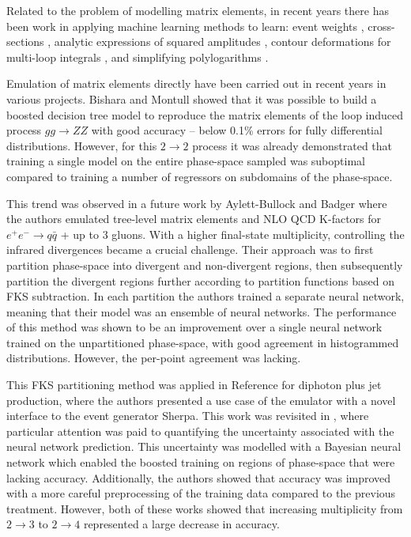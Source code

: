 \documentclass[main.tex]{subfiles}
\begin{document}
    Related to the problem of modelling matrix elements, in recent
    years there has been work in applying machine learning
    methods to learn: event weights \cite{Danziger:2021eeg},
    cross-sections \cite{Otten:2018kum,Buckley:2020bxg},
    analytic expressions of squared amplitudes \cite{Alnuqaydan:2022ncd},
    contour deformations for multi-loop integrals \cite{Winterhalder:2021ngy},
    and simplifying polylogarithms \cite{Dersy:2022bym}.

    Emulation of matrix elements directly have been
    carried out in recent years in various projects.
    Bishara and Montull showed \cite{Bishara:2019iwh} that it was possible to
    build a boosted decision tree model to reproduce
    the matrix elements of the loop induced process $gg \rightarrow ZZ$ with good accuracy --
    below 0.1\% errors for fully differential distributions.
    However, for this $2 \rightarrow 2$ process it was already demonstrated
    that training a single model on the entire phase-space sampled
    was suboptimal compared to training a number of regressors
    on subdomains of the phase-space.

    This trend was observed in a future work by Aylett-Bullock
    and Badger \cite{Badger:2020uow} where the authors emulated tree-level
    matrix elements and NLO QCD K-factors for $e^{+}e^{-} \rightarrow q \bar{q}$ +
    up to 3 gluons. With a higher final-state multiplicity, controlling
    the infrared divergences became a crucial challenge.
    Their approach was to first partition phase-space
    into divergent and non-divergent regions, then subsequently
    partition the divergent regions further according to partition functions
    based on FKS subtraction.
    In each partition the authors trained a separate neural network,
    meaning that their model was an ensemble of neural networks.
    The performance of this method was shown to be an improvement
    over a single neural network trained on the unpartitioned phase-space,
    with good agreement in histogrammed distributions. However,
    the per-point agreement was lacking.

    This FKS partitioning method was applied in Reference \cite{Aylett-Bullock:2021hmo}
    for diphoton plus jet production, where the authors presented a
    use case of the emulator with a novel interface to the event
    generator Sherpa. This work was revisited in \cite{Butter:2022rso},
    where particular attention was paid to quantifying the uncertainty associated
    with the neural network prediction. This uncertainty was
    modelled with a Bayesian neural network which enabled
    the boosted training on regions of phase-space that were
    lacking accuracy. Additionally, the authors showed
    that accuracy was improved with a more careful
    preprocessing of the training data compared to
    the previous treatment.
    However, both of these works showed that increasing
    multiplicity from $2 \rightarrow 3$ to $2 \rightarrow 4$
    represented a large decrease in accuracy.
\end{document}
